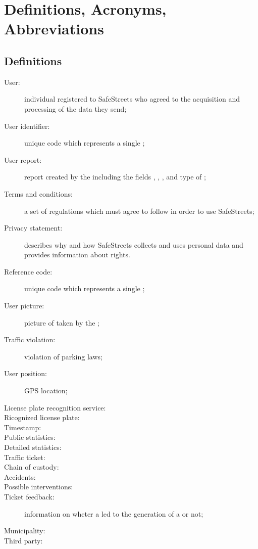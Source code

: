 \documentclass[../../rasd.tex]{subfiles}
\begin{document}
\section{Definitions, Acronyms, Abbreviations\label{sect:1.3}}

\subsection{Definitions\label{sect:1.3.1}}
\begin{description}
	\item[User:] individual registered to SafeStreets who agreed to the acquisition and processing of the data they send;
	\item[User identifier:] unique code which represents a single ;
	\item[User report:] report created by the  including the fields , , ,  and type of ;
	\item[Terms and conditions:] a set of regulations which  must agree to follow	in order to use SafeStreets;
	\item[Privacy statement:] describes why and how SafeStreets collects and uses personal data and provides information about  rights.
	\item[Reference code:] unique code which represents a single ;
	\item[User picture:] picture of  taken by the ;
	\item[Traffic violation:] violation of parking laws;
	\item[User position:]  GPS location;
	\item[License plate recognition service:]
	\item[Ricognized license plate:]
	\item[Timestamp:]
	\item[Public statistics:]
	\item[Detailed statistics:]
	\item[Traffic ticket:]
	\item[Chain of custody:]
	\item[Accidents:]
	\item[Possible interventions:]
	\item[Ticket feedback:] information on wheter a  led to the generation of a  or not;
	\item[Municipality:]
	\item[Third party:]
\end{description}
\end{document}

